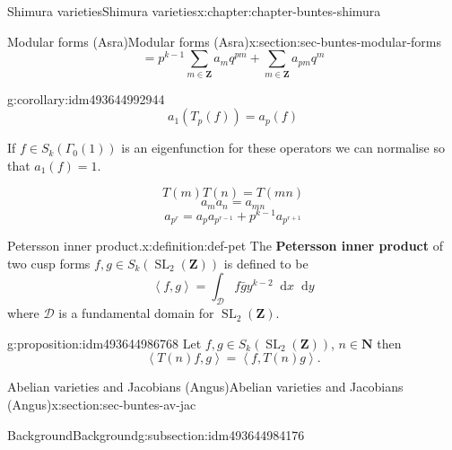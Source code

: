 \documentclass[oneside,10pt,]{book}
\newcommand{\terminology}[1]{\textbf{#1}}
\numberwithin{equation}{section}
\newcommand{\diff}{\mathop{}\!\mathrm{d}}
\newcommand{\pair}[2]{\left\langle #1, #2 \right\rangle}
\newcommand{\NN}{\mathbf{N}}
\newcommand{\ZZ}{\mathbf{Z}}
\DeclareMathOperator{\SL}{SL}
\begin{document}
\begin{chapterptx}{Shimura varieties}{}{Shimura varieties}{}{}{x:chapter:chapter-buntes-shimura}
\begin{sectionptx}{Modular forms (Asra)}{}{Modular forms (Asra)}{}{}{x:section:sec-buntes-modular-forms}
\begin{equation*}
\end{equation*}
%
\begin{equation*}
= p^{k-1} \sum_{m\in \ZZ} a_m q^{pm} +\sum_{m\in \ZZ} a_{pm}q^m
\end{equation*}
%
\begin{corollary}{}{}{g:corollary:idm493644992944}%
%
\begin{equation*}
a_1(T_p(f)) = a_p(f)
\end{equation*}
%
\end{corollary}
If \(f\in S_k(\Gamma_0(1))\) is an eigenfunction for these operators we can normalise so that \(a_1(f) = 1\).%
\par
%
\begin{equation*}
T(m)T(n) = T(mn)
\end{equation*}
%
\begin{equation*}
a_ma_n = a_{mn}
\end{equation*}
%
\begin{equation*}
a_{p^r} = a_p a_{p^{r-1}} + p^{k-1} a_{p^{r+1}}
\end{equation*}
%
\begin{definition}{Petersson inner product.}{x:definition:def-pet}%
The \terminology{Petersson inner product} of two cusp forms \(f,g\in S_k(\SL_2(\ZZ))\) is defined to be%
\begin{equation*}
\pair{f}{g} = \int_{\mathcal D} f \bar g y^{k-2} \diff x \diff y
\end{equation*}
where \(\mathcal D\) is a fundamental domain for \(\SL_2(\ZZ)\).%
\end{definition}
\begin{proposition}{}{}{g:proposition:idm493644986768}%
Let \(f,g\in S_k(\SL_2(\ZZ))\), \(n\in \NN\) then%
\begin{equation*}
\pair{T(n) f}{g} = \pair{f}{T(n)g}\text{.}
\end{equation*}
%
\end{proposition}
\end{sectionptx}
%
%
\typeout{************************************************}
\typeout{************************************************}
%
\begin{sectionptx}{Abelian varieties and Jacobians (Angus)}{}{Abelian varieties and Jacobians (Angus)}{}{}{x:section:sec-buntes-av-jac}
%
%
\typeout{************************************************}
\typeout{************************************************}
%
\begin{subsectionptx}{Background}{}{Background}{}{}{g:subsection:idm493644984176}

\end{subsectionptx}
\end{sectionptx}
\end{chapterptx}
\end{document}
